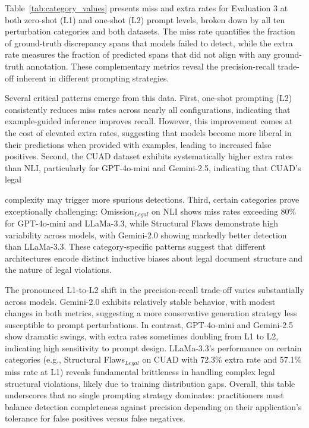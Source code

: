 \documentclass[11pt]{article}
\begin{document}
Table~\ref{tab:category_values} presents miss and extra rates for Evaluation 3 at both zero-shot (L1) and one-shot (L2) prompt levels, broken down by all ten perturbation categories and both datasets. The miss rate quantifies the fraction of ground-truth discrepancy spans that models failed to detect, while the extra rate measures the fraction of predicted spans that did not align with any ground-truth annotation. These complementary metrics reveal the precision-recall trade-off inherent in different prompting strategies.

Several critical patterns emerge from this data. First, one-shot prompting (L2) consistently reduces miss rates across nearly all configurations, indicating that example-guided inference improves recall. However, this improvement comes at the cost of elevated extra rates, suggesting that models become more liberal in their predictions when provided with examples, leading to increased false positives. Second, the CUAD dataset exhibits systematically higher extra rates than NLI, particularly for GPT-4o-mini and Gemini-2.5, indicating that CUAD's legal

 complexity may trigger more spurious detections. Third, certain categories prove exceptionally challenging: Omission$_{Legal}$ on NLI shows miss rates exceeding 80\% for GPT-4o-mini and LLaMa-3.3, while Structural Flaws demonstrate high variability across models, with Gemini-2.0 showing markedly better detection than LLaMa-3.3. These category-specific patterns suggest that different architectures encode distinct inductive biases about legal document structure and the nature of legal violations.

The pronounced L1-to-L2 shift in the precision-recall trade-off varies substantially across models. Gemini-2.0 exhibits relatively stable behavior, with modest changes in both metrics, suggesting a more conservative generation strategy less susceptible to prompt perturbations. In contrast, GPT-4o-mini and Gemini-2.5 show dramatic swings, with extra rates sometimes doubling from L1 to L2, indicating high sensitivity to prompt design. LLaMa-3.3's performance on certain categories (e.g., Structural Flaws$_{Legal}$ on CUAD with 72.3\% extra rate and 57.1\% miss rate at L1) reveals fundamental brittleness in handling complex legal structural violations, likely due to training distribution gaps. Overall, this table underscores that no single prompting strategy dominates: practitioners must balance detection completeness against precision depending on their application's tolerance for false positives versus false negatives.
\end{document}
